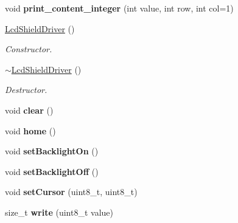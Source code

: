 \begin{DoxyCompactItemize}
\item 
\mbox{\label{classLcdShieldDriver_ae1a249341c06d6992767e8176ef96056}} 
void {\bfseries print\+\_\+content\+\_\+integer} (int value, int row, int col=1)
\item 
\mbox{\label{classLcdShieldDriver_a14d2027ac041be273d6b894a6d66bb1f}} 
\hyperlink{classLcdShieldDriver_a14d2027ac041be273d6b894a6d66bb1f}{Lcd\+Shield\+Driver} ()
\begin{DoxyCompactList}\small\item\em Constructor. \end{DoxyCompactList}\item 
\mbox{\label{classLcdShieldDriver_aaec080d1c36326c1e58642a7e28d85b1}} 
\hyperlink{classLcdShieldDriver_aaec080d1c36326c1e58642a7e28d85b1}{$\sim$\+Lcd\+Shield\+Driver} ()
\begin{DoxyCompactList}\small\item\em Destructor. \end{DoxyCompactList}\item 
\mbox{\label{classLcdShieldDriver_a43e151fc827a4d8d982bc2857b78262e}} 
void {\bfseries clear} ()
\item 
\mbox{\label{classLcdShieldDriver_a7bccc296eef476eb49984bdf8fdebb14}} 
void {\bfseries home} ()
\item 
\mbox{\label{classLcdShieldDriver_a68a86a7407fd3df5714f3351d657e499}} 
void {\bfseries set\+Backlight\+On} ()
\item 
\mbox{\label{classLcdShieldDriver_a81639e7553501343137be8984d7ea7d9}} 
void {\bfseries set\+Backlight\+Off} ()
\item 
\mbox{\label{classLcdShieldDriver_a6733a16dc0e1d58cfdfb4019ea2e6582}} 
void {\bfseries set\+Cursor} (uint8\+\_\+t, uint8\+\_\+t)
\item 
\mbox{\label{classLcdShieldDriver_aea03f93f7dfad9bc185bd77ef059c665}} 
size\+\_\+t {\bfseries write} (uint8\+\_\+t value)
\item 

\end{DoxyCompactItemize}
